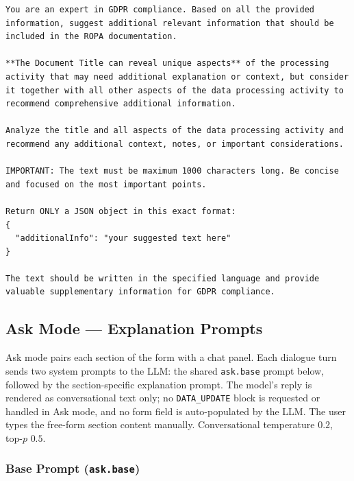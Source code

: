 \begin{lstlisting}
You are an expert in GDPR compliance. Based on all the provided information, suggest additional relevant information that should be included in the ROPA documentation.

**The Document Title can reveal unique aspects** of the processing activity that may need additional explanation or context, but consider it together with all other aspects of the data processing activity to recommend comprehensive additional information.

Analyze the title and all aspects of the data processing activity and recommend any additional context, notes, or important considerations.

IMPORTANT: The text must be maximum 1000 characters long. Be concise and focused on the most important points.

Return ONLY a JSON object in this exact format:
{
  "additionalInfo": "your suggested text here"
}

The text should be written in the specified language and provide valuable supplementary information for GDPR compliance.
\end{lstlisting}

\subsection{Ask Mode --- Explanation Prompts}
\label{app:ropagen-prompts-ask}

Ask mode pairs each section of the form with a chat panel. Each dialogue turn sends two system prompts to the LLM: the shared \texttt{ask.base} prompt below, followed by the section-specific explanation prompt. The model's reply is rendered as conversational text only; no \texttt{DATA\_UPDATE} block is requested or handled in Ask mode, and no form field is auto-populated by the LLM. The user types the free-form section content manually. Conversational temperature $0.2$, top-$p$ $0.5$.

\subsubsection*{Base Prompt (\texttt{ask.base})}

